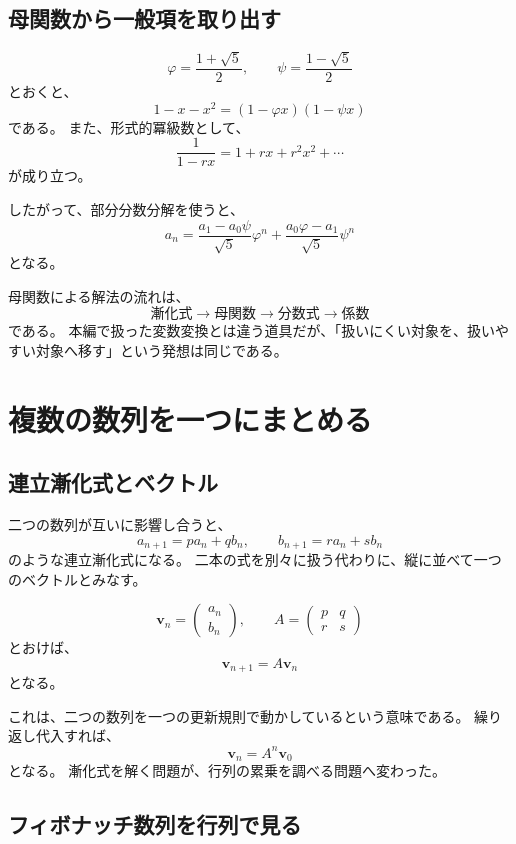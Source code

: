 \subsection{母関数から一般項を取り出す}

\[
  \varphi=\frac{1+\sqrt5}{2},\qquad
  \psi=\frac{1-\sqrt5}{2}
\]
とおくと、
\[
  1-x-x^2=(1-\varphi x)(1-\psi x)
\]
である。
また、形式的冪級数として、
\[
  \frac1{1-rx}=1+rx+r^2x^2+\cdots
\]
が成り立つ。

したがって、部分分数分解を使うと、
\[
  a_n=
  \frac{a_1-a_0\psi}{\sqrt5}\varphi^n
  +\frac{a_0\varphi-a_1}{\sqrt5}\psi^n
\]
となる。

母関数による解法の流れは、
\[
  \text{漸化式}
  \longrightarrow
  \text{母関数}
  \longrightarrow
  \text{分数式}
  \longrightarrow
  \text{係数}
\]
である。
本編で扱った変数変換とは違う道具だが、「扱いにくい対象を、扱いやすい対象へ移す」という発想は同じである。

\section{複数の数列を一つにまとめる}

\subsection{連立漸化式とベクトル}

二つの数列が互いに影響し合うと、
\[
  a_{n+1}=pa_n+qb_n,
  \qquad
  b_{n+1}=ra_n+sb_n
\]
のような連立漸化式になる。
二本の式を別々に扱う代わりに、縦に並べて一つのベクトルとみなす。

\[
  \boldsymbol v_n=
  \begin{pmatrix}a_n\\b_n\end{pmatrix},\qquad
  A=\begin{pmatrix}p&q\\r&s\end{pmatrix}
\]
とおけば、
\[
  \boldsymbol v_{n+1}=A\boldsymbol v_n
\]
となる。

これは、二つの数列を一つの更新規則で動かしているという意味である。
繰り返し代入すれば、
\[
  \boldsymbol v_n=A^n\boldsymbol v_0
\]
となる。
漸化式を解く問題が、行列の累乗を調べる問題へ変わった。

\subsection{フィボナッチ数列を行列で見る}

